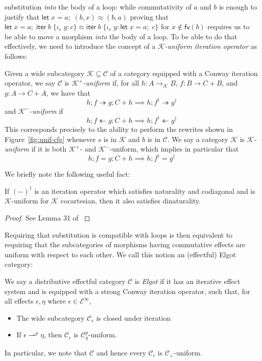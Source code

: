 \documentclass[acmsmall,screen,review]{acmart}
\newcommand{\mc}[1]{\ensuremath{\mathcal{#1}}}
\newcommand{\ms}[1]{\ensuremath{\mathsf{#1}}}
\newcommand{\lto}{:}
\newcommand{\linr}[1]{\iota_r\;{#1}}
\newcommand{\letexpr}[3]{\ensuremath{\ms{let}\;#1 = #2;\;#3}}
\newcommand{\liter}[3]{\ms{iter}\;#1\;\{ \linr{#2} \lto #3 \}}
\newcommand{\cref}{\twoheadrightarrow}
\newcommand{\anticref}{\twoheadleftarrow}
\newcommand{\rightmove}{\rightharpoonup}
\begin{document}
substitution \emph{into} the body of a loop: while commutativity of $a$ and $b$ is enough to justify
that
$
\letexpr{x}{a}{(b, x)} \approx (b, a)
$
proving that
$
\letexpr{x}{a}{\liter{b}{y}{c}} \approx \liter{b}{y}{\letexpr{x}{a}{c}}
$
for $x \notin \ms{fv}(b)$ requires us to be able to move a morphism \emph{into} the body of a loop.
To be able to do that effectively, we need to introduce the concept of a \emph{\mc{K}-uniform
iteration operator} as follows:
\begin{definition}[Uniformity]
  Given a wide subcategory $\mc{K} \subseteq \mc{C}$ of a category equipped with a Conway iteration
  operator, we say $\mc{C}$ is \emph{$\mc{K}^+$-uniform} if, for all $h : A \to_{\mc{K}} B$, $f : B
  \to C + B$, and $g : A \to C + A$, we have that
  $$
  h ; f \cref g ; C + h \implies h ; f^\dagger \cref g^\dagger 
  $$
  and \emph{$\mc{K}^-$-uniform} if
  $$
  h ; f \anticref g ; C + h \implies h ; f^\dagger \anticref g^\dagger 
  $$
  This corresponds precisely to the ability to perform the rewrites shown in
  Figure~\ref{fig:unif-cfg} whenever $s$ is in $\mc{K}$ and $b$ is in $\mc{C}$. We say a category
  $\mc{K}$ is \emph{$\mc{K}$-uniform} if it is both $\mc{K}^+$- and $\mc{K}^-$-uniform, which
  implies in particular that
  $$
  h ; f = g ; C + h \implies h ; f^\dagger = g^\dagger 
  $$
\end{definition}
We briefly note the following useful fact:
\begin{proposition}
  If $(-)^\dagger$ is an iteration operator which satisfies naturality and codiagonal and is
  $\mc{K}$-uniform for $\mc{K}$ cocartesian, then it also satisfies dinaturality.
\end{proposition}
\begin{proof}
  See Lemma 31 of \citet{goncharov-18-guarded-traced}
\end{proof}
Requiring that substitution is compatible with loops is then equivalent to requiring that the
subcategories of morphisms having commutative effects are uniform with respect to each other. We
call this notion an (effectful) Elgot category:
\begin{definition}
  We say a distributive effectful category $\mc{C}$ is \emph{Elgot} if it has an iterative effect
  system and is equipped with a strong Conway iteration operator, such that, for all effects
  $\epsilon, \eta$ where $\epsilon \in \mc{E}^\infty$,
  \begin{itemize}
    \item The wide subcategory $\mc{C}_\epsilon$ is closed under iteration  
    \item If $\epsilon \rightmove^p \eta$, then $\mc{C}_\epsilon$ is $\mc{C}_\eta^p$-uniform.
  \end{itemize}
  In particular, we note that $\mc{C}$ and hence every $\mc{C}_\epsilon$ is $\mc{C}_\bot$-uniform.
\end{definition}
\end{document}
